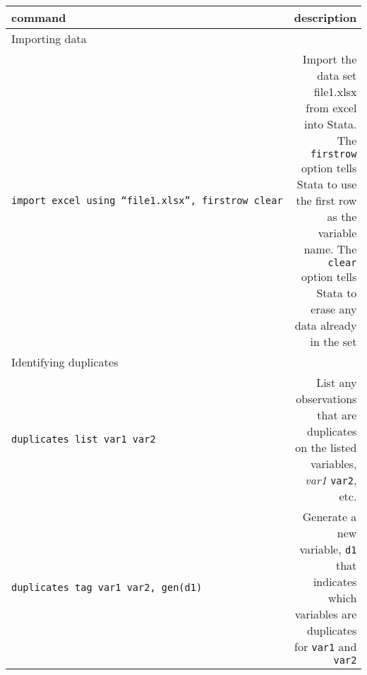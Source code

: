 \documentclass[
]{article}
\begin{document}
\begin{longtable}[]{@{}lr@{}}
\toprule
\begin{minipage}[b]{0.53\columnwidth}\raggedright
command\strut
\end{minipage} & \begin{minipage}[b]{0.41\columnwidth}\raggedleft
description\strut
\end{minipage}\tabularnewline
\midrule
\endhead
\begin{minipage}[t]{0.53\columnwidth}\raggedright
Importing data\strut
\end{minipage} & \begin{minipage}[t]{0.41\columnwidth}\raggedleft
\strut
\end{minipage}\tabularnewline
\begin{minipage}[t]{0.53\columnwidth}\raggedright
\texttt{import\ excel\ using\ “file1.xlsx”,\ firstrow\ clear}\strut
\end{minipage} & \begin{minipage}[t]{0.41\columnwidth}\raggedleft
Import the data set file1.xlsx from excel into Stata. The
\texttt{firstrow} option tells Stata to use the first row as the
variable name. The \texttt{clear} option tells Stata to erase any data
already in the set\strut
\end{minipage}\tabularnewline
\begin{minipage}[t]{0.53\columnwidth}\raggedright
Identifying duplicates\strut
\end{minipage} & \begin{minipage}[t]{0.41\columnwidth}\raggedleft
\strut
\end{minipage}\tabularnewline
\begin{minipage}[t]{0.53\columnwidth}\raggedright
\texttt{duplicates\ list\ var1\ var2}\strut
\end{minipage} & \begin{minipage}[t]{0.41\columnwidth}\raggedleft
List any observations that are duplicates on the listed variables,
\emph{var1} \texttt{var2}, etc.\strut
\end{minipage}\tabularnewline
\begin{minipage}[t]{0.53\columnwidth}\raggedright
\texttt{duplicates\ tag\ var1\ var2,\ gen(d1)}\strut
\end{minipage} & \begin{minipage}[t]{0.41\columnwidth}\raggedleft
Generate a new variable, \texttt{d1} that indicates which variables are
duplicates for \texttt{var1} and \texttt{var2}\strut
\end{minipage}\tabularnewline

\end{longtable}
\end{document}

